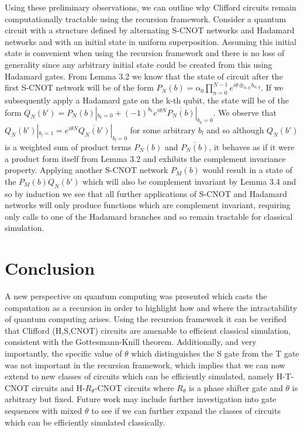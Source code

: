 \documentclass[reqno]{amsart}
\theoremstyle{definition}
\theoremstyle{remark}
\begin{document}
Using these preliminary observations, we can outline why Clifford circuits remain computationally tractable using the recursion framework. Consider a quantum circuit with a structure defined by alternating  S-CNOT networks and Hadamard networks and with an initial state in uniform superposition. Assuming this initial state is convenient when using the recursion framework and there is no loss of generality since any arbitrary initial state could be created from this using Hadamard gates.  From Lemma 3.2 we know that the state of circuit after the first S-CNOT network will be of the form  $P_N(b) = \alpha_0 \prod_{n=0}^{N-1} {e^{i \theta \oplus_{n,q} b_{n,q}} }$. If we subsequently apply a Hadamard gate on the k-th qubit, the state will be of the form $Q_N(b') = P_N(b)|_{b_k = 0} + (-1)^{b_k} e^{i \theta N } \overline{P_N(b)} |_{b_k = 0}  $. We observe that $Q_N(b') |_{b_l = 1 } = e^{i \theta N} \overline{ Q_N(b')} |_{b_l = 0}  $ for some arbitrary $b_l$ and so although  $Q_N(b')$ is a weighted sum of product terms $P_N(b)$ and $\overline{P_N(b)}$, it behaves as if it were a product form itself from Lemma 3.2 and exhibits the complement invariance property.  Applying another S-CNOT network $P_M(b)$  would result in a state of the  $P_M(b)Q_N(b')$  which will also be complement invariant by Lemma 3.4 and so by induction we see that all further applications of S-CNOT and Hadamard networks will only produce functions which are complement invariant, requiring only calls to one of the Hadamard branches and so remain tractable for classical simulation.
 


\section{Conclusion}
\noindent
A new perspective on quantum computing was presented which casts the computation as a recursion in order to highlight how and where the intractability of quantum computing arises. Using the recursion framework it can be verified that Clifford (H,S,CNOT) circuits are amenable to efficient classical simulation, consistent with the Gottesmann-Knill theorem. Additionally, and very importantly, the specific value of $\theta$ which distinguishes the S gate from the T gate was not important in the recursion framework, which implies that we can now extend to new classes of circuits which can be efficiently simulated, namely H-T-CNOT circuits and H-$R_{\theta}$-CNOT circuits where $R_{\theta}$ is a phase shifter gate and $\theta$ is arbitrary but fixed. Future work may include further investigation into gate sequences with mixed $\theta$ to see if we can further expand the classes of circuits which can be efficiently simulated classically.
\end{document}
